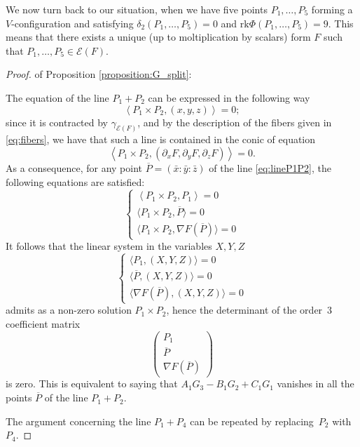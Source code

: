\documentclass{amsart}
\theoremstyle{plain}
\theoremstyle{definition}
\newcommand{\de}{\partial}
\newcommand{\Eig}[1]{\mathcal{E}\!\left( {#1} \right)}
\newcommand{\rk}{\ensuremath{\mathrm{rk}}}
\begin{document}
We now turn back to our situation, when we have five points $P_1, \dots, P_5$ forming a $V$-configuration and satisfying $\delta_2(P_1, \dots, P_5)=0$ and $\rk \Phi(P_1, \dotsc, P_5) = 9$. This means that there exists a unique (up to moltiplication by scalars) form $F$ such that $P_1, \dotsc, P_5 \in \Eig{F}$.

\begin{proof} of Proposition \ref{proposition:G_split}:

The equation of the line $P_1 +P_2$ can be expressed in the following way
%
\begin{equation}
\label{eq:lineP1P2}
  \left\langle P_1 \times P_2, (x,y,z) \right\rangle = 0;
\end{equation}
%
since it is contracted by $\gamma_{\Eig{F}}$, and by the description of the fibers given in \eqref{eq:fibers}, we have that such a line is contained in the conic of equation
%
\[
  \left\langle P_1 \times P_2, (\de_x F, \de_y F, \de_z F) \right\rangle = 0.
\]
%
As a consequence, for any point $\overline{P} = (\bar x: \bar y: \bar z)$ of the line \eqref{eq:lineP1P2}, the following equations are satisfied:
%
\[
\left\{
\begin{array}{l}
  \left\langle P_1 \times P_2, P_1 \right\rangle = 0\\[2pt]
  \bigl\langle P_1 \times P_2, \overline{P} \bigr\rangle = 0\\[2pt]
  \bigl\langle P_1 \times P_2, \nabla F (\overline{P}) \bigr\rangle = 0
\end{array}
\right.
\]
%
It follows that the linear system in the variables $X,Y,Z$
%
\[
\left\{
\begin{array}{l}
  \bigl\langle  P_1, (X,Y,Z) \bigr\rangle = 0\\[2pt]
  \bigl\langle \overline{P}, (X,Y,Z) \bigr\rangle = 0\\[2pt]
  \bigl\langle \nabla F (\overline{P}),
  (X,Y,Z) \bigr\rangle = 0
\end{array}
\right.
\]
%
admits as a non-zero solution $P_1 \times P_2$,
hence the determinant of the order~$3$ coefficient matrix
%
\[
 \left(
 \begin{array}{c}
  P_1 \\
  \overline{P} \\
  \nabla F (\overline{P})
 \end{array}
 \right)
\]
%
is zero. This is equivalent to saying that $A_1 G_3 - B_1 G_2 +C_1 G_1$ vanishes in all the points $\overline{P}$ of the line $P_1 +P_2$.

The argument concerning the line $P_1 + P_4$  can be repeated by replacing~$P_2$ with~$P_4$.
\end{proof}
\end{document}

